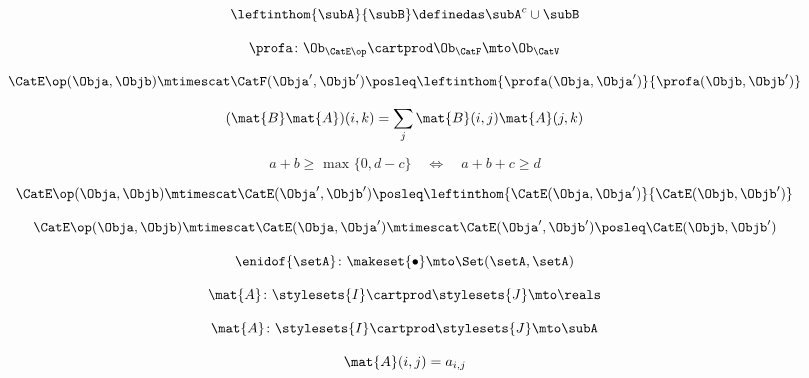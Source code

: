 \begin{forslides}
    \begin{equation}
        \label{eq:slides_enrichment_65}
        \leftinthom{\subA}{\subB} \definedas \subA^{c} \cup \subB
    \end{equation}

    \begin{equation}
        \label{eq:slides_enrichment_66}
        \profa \colon \Ob_{\CatE\op} \cartprod \Ob_{\CatF} \mto \Ob_\CatV
    \end{equation}

    \begin{equation}
        \label{eq:slides_enrichment_67}
        \CatE\op(\Obja, \Objb) \mtimescat \CatF(\Obja', \Objb') \posleq \leftinthom{\profa(\Obja, \Obja')}{\profa(\Objb, \Objb')}
    \end{equation}

    \begin{equation}
        \label{eq:slides_enrichment_68}
        (\mat{B} \mat{A})(i, k) = \sum_{j} \mat{B}(i,j) \mat{A}(j,k)
    \end{equation}

    \begin{equation}
        \label{eq:slides_enrichment_69}
        a + b \geq \text{ max } \{ 0, d - c \} \quad \Leftrightarrow \quad a + b + c \geq d
    \end{equation}

    \begin{equation}
        \label{eq:slides_enrichment_70}
        \CatE\op(\Obja, \Objb) \mtimescat \CatE(\Obja', \Objb') \posleq \leftinthom{\CatE(\Obja, \Obja')}{\CatE(\Objb, \Objb')}
    \end{equation}

    \begin{equation}
        \label{eq:slides_enrichment_71}
        \CatE\op(\Obja, \Objb) \mtimescat \CatE(\Obja, \Obja') \mtimescat \CatE(\Obja', \Objb') \posleq \CatE(\Objb, \Objb')
    \end{equation}

    \begin{equation}
        \label{eq:slides_enrichment_72}
        \enidof{\setA} \colon \makeset{ \bullet } \mto \Set(\setA, \setA)
    \end{equation}

    \begin{equation}
        \label{eq:slides_enrichment_73}
        \mat{A} \colon \stylesets{I} \cartprod \stylesets{J} \mto \reals
    \end{equation}

    \begin{equation}
        \label{eq:slides_enrichment_74}
        \mat{A} \colon \stylesets{I} \cartprod \stylesets{J} \mto \subA
    \end{equation}

    \begin{equation}
        \label{eq:slides_enrichment_75}
        \mat{A}(i, j) = a_{i,j}
    \end{equation}

\end{forslides}

